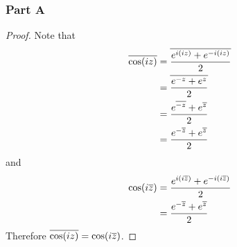 \documentclass[12pt,titlepage]{extarticle}
\begin{document}
\subsubsection*{Part A}
\begin{proof}
    Note that
    \begin{align*}
        \overline{\cos(iz)} &= \overline{\frac{e^{i(iz)} + e^{-i(iz)}}{2}} \\
                        &= \overline{\frac{e^{-z} + e^z}{2}} \\
                        &= \frac{e^{\overline{-z}} + e^{\overline{z}}}{2} \\
                        &= \frac{e^{-\overline{z}} + e^{\overline{z}}}{2}
    \end{align*}
    and
    \begin{align*}
        \cos(i \overline{z}) &= \frac{e^{i (i \overline{z})} + e^{-i (i \overline{z})}}{2} \\
                         &= \frac{e^{-\overline{z}} + e^{\overline{z}}}{2}
    \end{align*}
    Therefore $\overline{\cos(iz)} = \cos(i \overline{z})$.
\end{proof}
\end{document}

